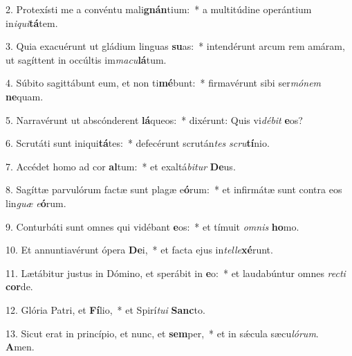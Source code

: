 2. Protexísti me a convéntu mali\textbf{gnán}tium:~*  a multitúdine operántium in\textit{i}\textit{qui}\textbf{tá}tem.\

3. Quia exacuérunt ut gládium linguas \textbf{su}as:~*  intendérunt arcum rem amáram, ut sagíttent in occúltis im\textit{ma}\textit{cu}\textbf{lá}tum.\

4. Súbito sagittábunt eum, et non ti\textbf{mé}bunt:~*  firmavérunt sibi ser\textit{mó}\textit{nem} \textbf{ne}quam.\

5. Narravérunt ut abscónderent \textbf{lá}queos:~*  dixérunt: Quis vi\textit{dé}\textit{bit} \textbf{e}os?\

6. Scrutáti sunt iniqui\textbf{tá}tes:~*  defecérunt scrután\textit{tes} \textit{scru}\textbf{tí}nio.\

7. Accédet homo ad cor \textbf{al}tum:~*  et exaltá\textit{bi}\textit{tur} \textbf{De}us.\

8. Sagíttæ parvulórum factæ sunt plagæ e\textbf{ó}rum:~*  et infirmátæ sunt contra eos lin\textit{guæ} \textit{e}\textbf{ó}rum.\

9. Conturbáti sunt omnes qui vidébant \textbf{e}os:~*  et tímuit \textit{om}\textit{nis} \textbf{ho}mo.\

10. Et annuntiavérunt ópera \textbf{De}i,~*  et facta ejus in\textit{tel}\textit{le}\textbf{xé}runt.\

11. Lætábitur justus in Dómino, et sperábit in \textbf{e}o:~*  et laudabúntur omnes \textit{rec}\textit{ti} \textbf{cor}de.\

12. Glória Patri, et \textbf{Fí}lio,~*  et Spirí\textit{tu}\textit{i} \textbf{Sanc}to.\

13. Sicut erat in princípio, et nunc, et \textbf{sem}per,~*  et in sǽcula sæcu\textit{ló}\textit{rum}. \textbf{A}men.\

